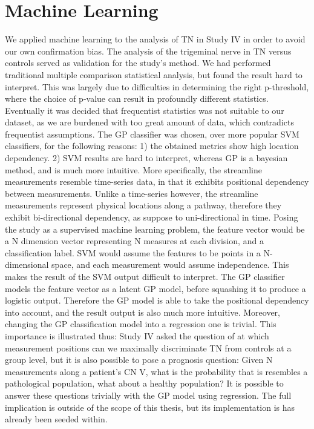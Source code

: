 \section{Machine Learning}

We applied machine learning to the analysis of TN in Study IV in order to avoid our own confirmation bias. The analysis of the trigeminal nerve in TN versus controls served as validation for the study's method. We had performed traditional multiple comparison statistical analysis, but found the result hard to interpret. This was largely due to difficulties in determining the right p-threshold, where the choice of p-value can result in profoundly different statistics. Eventually it was decided that frequentist statistics was not suitable to our dataset, as we are burdened with too great amount of data, which contradicts frequentist assumptions. The GP classifier was chosen, over more popular SVM classifiers, for the following reasons: 1) the obtained metrics show high location dependency. 2) SVM results are hard to interpret, whereas GP is a bayesian method, and is much more intuitive. More specifically, the streamline measurements resemble time-series data, in that it exhibits positional dependency between measurements. Unlike a time-series however, the streamline measurements represent physical locations along a pathway, therefore they exhibit bi-directional dependency, as suppose to uni-directional in time. Posing the study as a supervised machine learning problem, the feature vector would be a N dimension vector representing N measures at each division, and a classification label. SVM would assume the features to be points in a N-dimensional space, and each measurement would assume independence. This makes the result of the SVM output difficult to interpret. The GP classifier models the feature vector as a latent GP model, before squashing it to produce a logistic output. Therefore the GP model is able to take the positional dependency into account, and the result output is also much more intuitive. Moreover, changing the GP classification model into a regression one is trivial. This importance is illustrated thus: Study IV asked the question of at which measurement positions can we maximally discriminate TN from controls at a group level, but it is also possible to pose a prognosis question: Given N measurements along a patient's CN V, what is the probability that is resembles a pathological population, what about a healthy population? It is possible to answer these questions trivially with the GP model using regression. The full implication is outside of the scope of this thesis, but its implementation is has already been seeded within. 

